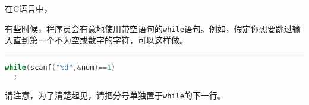\begin{frame}[fragile]
在C语言中，
\end{frame}

\begin{frame}[fragile]
有些时候，程序员会有意地使用带空语句的\lstinline|while|语句。例如，假定你想要跳过输入直到第一个不为空或数字的字符，可以这样做。
\rule{\textwidth}{1mm}\pause 

\begin{lstlisting}[language=c]
while(scanf("%d",&num)==1)
  ;
\end{lstlisting}\pause

请注意，为了清楚起见，请把分号单独置于\lstinline|while|的下一行。
\end{frame}

